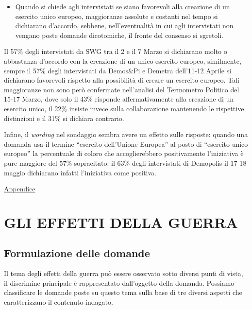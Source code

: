 \documentclass[
]{book}
\providecommand{\tightlist}{%
  \setlength{\itemsep}{0pt}\setlength{\parskip}{0pt}}
\begin{document}
\begin{itemize}
\tightlist
\item
  Quando si chiede agli intervistati se siano favorevoli alla creazione di un esercito unico europeo, maggioranze assolute e costanti nel tempo si dichiarano d'accordo, sebbene, nell'eventualità in cui agli intervistati non vengano poste domande dicotomiche, il fronte del consenso si sgretoli.
\end{itemize}

Il 57\% degli intervistati da SWG tra il 2 e il 7 Marzo si dichiarano molto o abbastanza d'accordo con la creazione di un unico esercito europeo, similmente, sempre il 57\% degli intervistati da Demos\&Pi e Demetra dell'11-12 Aprile si dichiarano favorevoli rispetto alla possibilità di creare un esercito europeo. Tali maggioranze non sono però confermate nell'analisi del Termometro Politico del 15-17 Marzo, dove solo il 43\% risponde affermativamente alla creazione di un esercito unico, il 22\% insiste invece sulla collaborazione mantenendo le rispettive distinzioni e il 31\% si dichiara contrario.

Infine, il \emph{wording} nel sondaggio sembra avere un effetto sulle risposte: quando una domanda usa il termine ``esercito dell'Unione Europea'' al posto di ``esercito unico europeo'' la percentuale di coloro che accoglierebbero positivamente l'iniziativa è pure maggiore del 57\% sopracitato: il 63\% degli intervistati di Demopolis il 17-18 maggio dichiarano infatti l'iniziativa come positiva.

\href{https://github.com/LucianaFazio/Ucrania/blob/main/V.\%20Cosa\%20dobbiamo\%20possiamo\%20fare\%20noi\%20v.5.pdf}{Appendice}

\hypertarget{gli-effetti-della-guerra}{%
\chapter{GLI EFFETTI DELLA GUERRA}\label{gli-effetti-della-guerra}}

\hypertarget{formulazione-delle-domande-4}{%
\section{Formulazione delle domande}\label{formulazione-delle-domande-4}}

Il tema degli effetti della guerra può essere osservato sotto diversi punti di vista, il discrimine principale è rappresentato dall'oggetto della domanda. Possiamo classificare le domande poste su questo tema sulla base di tre diversi aspetti che caratterizzano il contenuto indagato.
\end{document}
